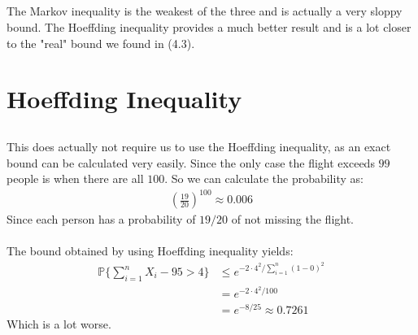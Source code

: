 \documentclass[a4paper]{article}
\begin{document}
\subsection{}
The Markov inequality is the weakest of the three and is actually a very sloppy bound. The Hoeffding inequality provides a much better result and is a lot closer to the "real" bound we found in (4.3).

\section{Hoeffding Inequality}
\subsection{}
This does actually not require us to use the Hoeffding inequality, as an exact bound can be calculated very easily. Since the only case the flight exceeds $99$ people is when there are all $100$. So we can calculate the probability as:
\begin{align*}
\left(\frac{19}{20}\right)^{100}\approx 0.006
\end{align*}
Since each person has a probability of $19/20$ of not missing the flight. \\
\\
The bound obtained by using Hoeffding inequality yields:
\begin{align*}
\mathbb{P}\{\sum_{i=1}^nX_i-95 > 4\}&\leq e^{-2\cdot 4^2/\sum_{i=1}^n(1-0)^2} \\
&= e^{-2\cdot 4^2/100} \\
&=e^{-8/25}\approx 0.7261
\end{align*}
Which is a lot worse.
\end{document}
